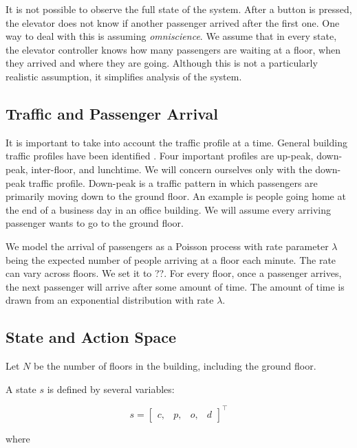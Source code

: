 It is not possible to observe the full state of the system. After a button is pressed, the elevator does not know if another passenger arrived after the first one. One way to deal with this is assuming \textit{omniscience}. We assume that in every state, the elevator controller knows how many passengers are waiting at a floor, when they arrived and where they are going. Although this is not a particularly realistic assumption, it simplifies analysis of the system.

\subsection{Traffic and Passenger Arrival}

It is important to take into account the traffic profile at a time. General building traffic profiles have been identified \cite{elevator_dynamics}. Four important profiles are up-peak, down-peak, inter-floor, and lunchtime. We will concern ourselves only with the down-peak traffic profile. Down-peak is a traffic pattern in which passengers are primarily moving down to the ground floor. An example is people going home at the end of a business day in an office building. We will assume every arriving passenger wants to go to the ground floor.

We model the arrival of passengers as a Poisson process with rate parameter $\lambda$ being the expected number of people arriving at a floor each minute. The rate can vary across floors. We set it to ??. For every floor, once a passenger arrives, the next passenger will arrive after some amount of time. The amount of time is drawn from an exponential distribution with rate $\lambda$.

\subsection{State and Action Space}

Let $N$ be the number of floors in the building, including the ground floor.

A state $s$ is defined by several variables:

\[
s = \begin{bmatrix} c, & p, & o, & d \end{bmatrix}^\top
\]

where

